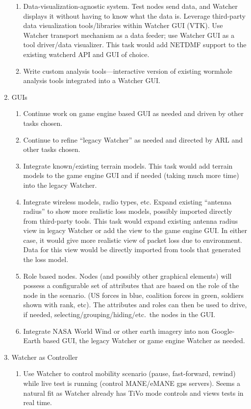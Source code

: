 \documentclass{report}
\begin{document}
\begin{enumerate}
\begin{enumerate}
        \item Data-visualization-agnostic system. Test nodes send data, and Watcher displays it without having to know what the data is. Leverage third-party data visualization tools\slash libraries within Watcher GUI (VTK). Use Watcher transport mechanism as a data feeder; use Watcher GUI as a tool driver\slash data visualizer. This task would add NETDMF support to the existing watcherd API and GUI of choice. 
        \item Write custom analysis tools---interactive version of existing wormhole analysis tools integrated into a Watcher GUI.
\end{enumerate}
\item GUIs 
\begin{enumerate}
    \item Continue work on game engine based GUI as needed and driven by other tasks chosen. 
    \item Continue to refine ``legacy Watcher'' as needed and directed by ARL and other tasks chosen.
    \item Integrate known\slash existing terrain models. This task would add terrain models to the game engine GUI and if needed (taking much more time) into the legacy Watcher.
    \item Integrate wireless models, radio types, etc. Expand existing ``antenna radius'' to show more realistic loss models, possibly imported directly from third-party tools. This task would expand existing antenna radius view in legacy Watcher or add the view to the game engine GUI. In either case, it would give more realistic view of packet loss due to environment. Data for this view would be directly imported from tools that generated the loss model. 
    \item Role based nodes. Nodes (and possibly other graphical elements) will possess a configurable set of attributes that are based on the role of the node in the scenario. (US forces in blue, coalition forces in green, soldiers shown with rank, etc). The attributes and roles can then be used to drive, if needed, selecting\slash grouping\slash hiding\slash etc.\ the nodes in the GUI.   
    \item Integrate NASA World Wind or other earth imagery into non Google-Earth based GUI, the legacy Watcher or game engine Watcher as needed. 
\end{enumerate}
\item Watcher as Controller 
\begin{enumerate}
    \item Use Watcher to control mobility scenario (pause, fast-forward, rewind) while live test is running (control MANE\slash eMANE gps servers). Seems a natural fit as Watcher already has TiVo mode controls and views tests in real time. 

\end{enumerate}
\end{enumerate}
\end{document}
